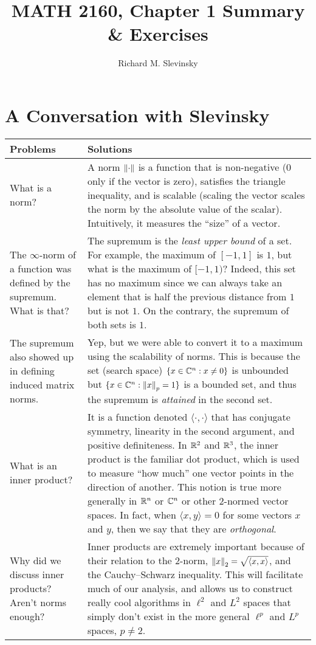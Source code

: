 \documentclass[11pt,letterpaper]{article}
\begin{document}
\title{MATH 2160, Chapter 1 Summary \& Exercises}
\author{Richard M. Slevinsky}
\date{}
\maketitle

\section*{A Conversation with Slevinsky}

\begin{longtable}{p{}|p{}}
\hline
Problems & Solutions\\
\hline
What is a norm? & A norm $\left\|{\cdot}\right\|$ is a function that is non-negative ($0$ only if the vector is zero), satisfies the triangle inequality, and is scalable (scaling the vector scales the norm by the absolute value of the scalar). Intuitively, it measures the ``size'' of a vector.\\
The $\infty$-norm of a function was defined by the supremum. What is that? & The supremum is the {\em least upper bound} of a set. For example, the maximum of $[-1,1]$ is $1$, but what is the maximum of $[-1,1)$? Indeed, this set has no maximum since we can always take an element that is half the previous distance from $1$ but is not $1$. On the contrary, the supremum of both sets is $1$.\\
The supremum also showed up in defining induced matrix norms. & Yep, but we were able to convert it to a maximum using the scalability of norms. This is because the set (search space) $\{x\in\mathbb{C}^n : x \ne0\}$ is unbounded but $\{x\in\mathbb{C}^n : \left\|{x}\right\|_p = 1\}$ is a bounded set, and thus the supremum is {\em attained} in the second set.\\
What is an inner product? & It is a function denoted $\langle\cdot,\cdot\rangle$ that has conjugate symmetry, linearity in the second argument, and positive definiteness. In $\mathbb{R}^2$ and $\mathbb{R}^3$, the inner product is the familiar dot product, which is used to measure ``how much'' one vector points in the direction of another. This notion is true more generally in $\mathbb{R}^n$ or $\mathbb{C}^n$ or other $2$-normed vector spaces. In fact, when $\langle x, y\rangle = 0$ for some vectors $x$ and $y$, then we say that they are {\em orthogonal}.\\
Why did we discuss inner products? Aren't norms enough? & Inner products are extremely important because of their relation to the $2$-norm, $\left\|{x}\right\|_2 = \sqrt{\langle x,x\rangle}$, and the Cauchy--Schwarz inequality. This will facilitate much of our analysis, and allows us to construct really cool algorithms in $\ell^2$ and $L^2$ spaces that simply don't exist in the more general $\ell^p$ and $L^p$ spaces, $p\ne2$.\\

\end{longtable}
\end{document}
